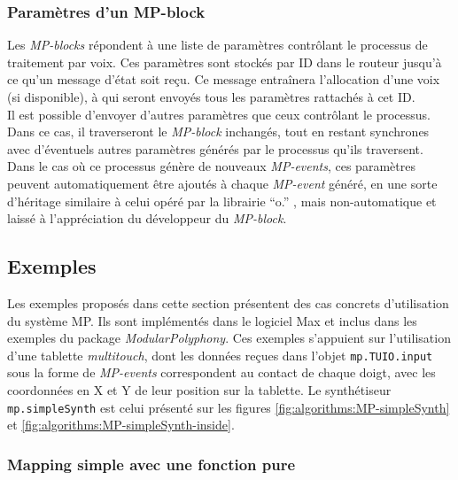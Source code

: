 \subsubsection{Paramètres d'un MP-block}

\noindent Les \textit{MP-blocks} répondent à une liste de paramètres contrôlant le processus de traitement par voix. Ces paramètres sont stockés par ID dans le routeur jusqu'à ce qu'un message d'état soit reçu. Ce message entraînera l'allocation d'une voix (si disponible), à qui seront envoyés tous les paramètres rattachés à cet ID.\\
\indent Il est possible d'envoyer d'autres paramètres que ceux contrôlant le processus. Dans ce cas, il traverseront le \textit{MP-block} inchangés, tout en restant synchrones avec d'éventuels autres paramètres générés par le processus qu'ils traversent. Dans le cas où ce processus génère de nouveaux \textit{MP-events}, ces paramètres peuvent automatiquement être ajoutés à chaque \textit{MP-event} généré, en une sorte d'héritage similaire à celui opéré par la librairie ``o.'' \cite{freed_composability_2011}, mais non-automatique et laissé à l'appréciation du développeur du \textit{MP-block}.

\subsection{Exemples}

\noindent Les exemples proposés dans cette section présentent des cas concrets d'utilisation du système MP. Ils sont implémentés dans le logiciel Max et inclus dans les exemples du package \textit{ModularPolyphony}. Ces exemples s'appuient sur l'utilisation d'une tablette \textit{multitouch}, dont les données reçues dans l'objet \verb|mp.TUIO.input| sous la forme de \textit{MP-events} correspondent au contact de chaque doigt, avec les coordonnées en X et Y de leur position sur la tablette. Le synthétiseur \verb|mp.simpleSynth| est celui présenté sur les figures \ref{fig:algorithms:MP-simpleSynth} et \ref{fig:algorithms:MP-simpleSynth-inside}.

\subsubsection{Mapping simple avec une fonction pure}

